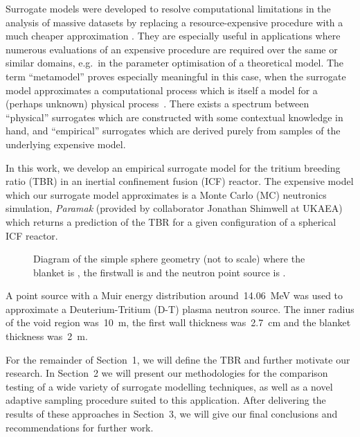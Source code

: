 Surrogate models were developed to resolve computational limitations in the analysis of massive datasets by replacing a resource-expensive procedure with a much cheaper approximation
\cite{Sondergaard2003}. They are especially useful in applications where
numerous evaluations of an expensive procedure are required over the same or
similar domains, e.g.~in the parameter optimisation of a theoretical model. The
term ``metamodel'' proves especially meaningful in this case, when the surrogate
model approximates a computational process which is itself a model for a
(perhaps unknown) physical process~\cite{Myers2002}. There exists a spectrum
between ``physical'' surrogates which are constructed with some contextual
knowledge in hand, and ``empirical'' surrogates which are derived purely from
samples of the underlying expensive model.

In this work, we develop an empirical surrogate model for the tritium breeding
ratio (TBR) in an inertial confinement fusion (ICF) reactor. The
expensive model which our surrogate model approximates is a Monte Carlo (MC)
neutronics simulation, \textit{Paramak} (provided by collaborator
Jonathan Shimwell at UKAEA) which returns a prediction of the TBR for a given configuration of a spherical ICF reactor.

\begin{figure}[!ht]
  \centering

    \caption{Diagram of the simple sphere geometry (not to scale) where the blanket is , the firstwall is  and the neutron point source is .}
    \label{fig:model_diagram}
\end{figure}

A point source with a Muir energy distribution \cite{openmcmuir} around~\SI{14.06}{\mega\electronvolt} was used to approximate a Deuterium-Tritium (D-T) plasma neutron source. 
The inner radius of the void region was~\SI{10}{\metre}, the first wall
thickness was~\SI{2.7}{\centi\metre} and the blanket thickness
was~\SI{2}{\metre}.

For the remainder of Section~1, we will define the TBR and further motivate our
research. In Section~2 we will present our methodologies for the comparison
testing of a wide variety of surrogate modelling techniques, as well as a novel
adaptive sampling procedure suited to this application. After delivering the
results of these approaches in Section~3, we will give our final conclusions and recommendations for further work.

